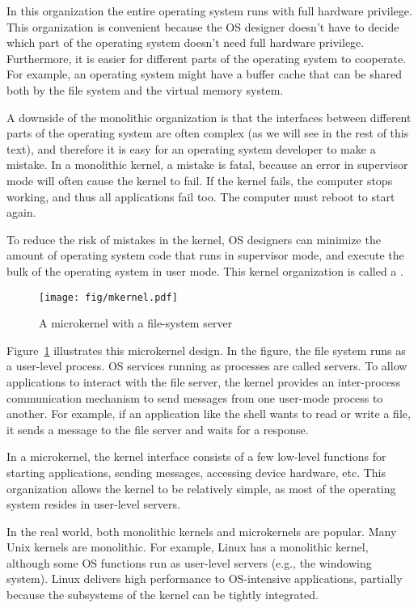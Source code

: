 In this organization the entire operating system runs with full hardware
privilege. This organization is convenient because the OS designer doesn't have
to decide which part of the operating system doesn't need full hardware
privilege.  Furthermore, it is easier for different parts of the operating system to
cooperate.  For example, an operating system might have a buffer cache that can
be shared both by the file system and the virtual memory system. 

A downside of the monolithic organization is that the interfaces between
different parts of the operating system are often complex (as we will see in the
rest of this text), and therefore it is easy for an operating system developer
to make a mistake.  In a monolithic kernel, a mistake is fatal, because an error
in supervisor mode will often cause the kernel to fail.  If the kernel fails,
the computer stops working, and thus all applications fail too.  The computer
must reboot to start again.

To reduce the risk of mistakes in the kernel, OS designers can minimize the
amount of operating system code that runs in supervisor mode, and execute the
bulk of the operating system in user mode.
This kernel organization is called a
.

\begin{figure}[t]
\center
\texttt{[image: fig/mkernel.pdf]}
\caption{A microkernel with a file-system server}
\label{fig:mkernel}
\end{figure}

Figure~\ref{fig:mkernel}
illustrates this microkernel design.  In the figure, the file system runs as a
user-level process.  OS services running as processes are called servers.
To allow applications to interact with the
file server, the kernel provides an inter-process communication
mechanism to send messages from one
user-mode process to another.  For example, if an application like the shell
wants to read or write a file, it sends a message to the file server and waits
for a response. 

In a microkernel, the kernel interface consists of a few low-level
functions for starting applications, sending messages,
accessing device hardware, etc.  This organization allows the kernel to be 
relatively simple, as most of the operating system
resides in user-level servers.

In the real world, both monolithic kernels and microkernels are
popular. Many
Unix kernels are monolithic. For example, Linux has a monolithic kernel,
although some OS functions run as user-level servers (e.g., the windowing
system).  Linux delivers high performance to OS-intensive applications, partially
because the subsystems of the kernel can be tightly integrated.

